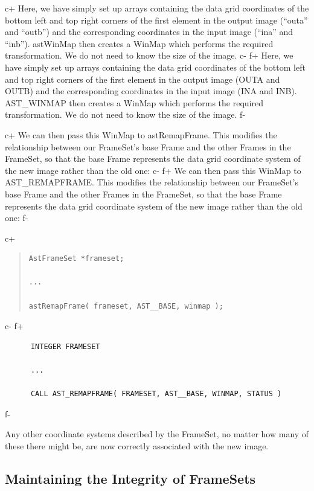 \documentclass[twoside,11pt]{article}
\begin{document}
c+
Here, we have simply set up arrays containing the data grid
coordinates of the bottom left and top right corners of the first
element in the output image (``outa'' and ``outb'') and the
corresponding coordinates in the input image (``ina'' and
``inb''). astWinMap then creates a WinMap which performs the required
transformation. We do not need to know the size of the image.
c-
f+
Here, we have simply set up arrays containing the data grid
coordinates of the bottom left and top right corners of the first
element in the output image (OUTA and OUTB) and the corresponding
coordinates in the input image (INA and INB). AST\_WINMAP then creates
a WinMap which performs the required transformation. We do not need to
know the size of the image.
f-

c+
We can then pass this WinMap to astRemapFrame. This modifies the
relationship between our FrameSet's base Frame and the other Frames in
the FrameSet, so that the base Frame represents the data grid
coordinate system of the new image rather than the old one:
c-
f+
We can then pass this WinMap to AST\_REMAPFRAME. This modifies the
relationship between our FrameSet's base Frame and the other Frames in
the FrameSet, so that the base Frame represents the data grid
coordinate system of the new image rather than the old one:
f-

c+
\begin{quote}
\small
\begin{verbatim}
AstFrameSet *frameset;

...

astRemapFrame( frameset, AST__BASE, winmap );
\end{verbatim}
\normalsize
\end{quote}
c-
f+
\small
\begin{verbatim}
      INTEGER FRAMESET

      ...

      CALL AST_REMAPFRAME( FRAMESET, AST__BASE, WINMAP, STATUS )
\end{verbatim}
\normalsize
f-

Any other coordinate systems described by the FrameSet, no matter how
many of these there might be, are now correctly associated with the
new image.

\subsection{\label{ss:framesetintegrity}Maintaining the Integrity of FrameSets}
\end{document}
